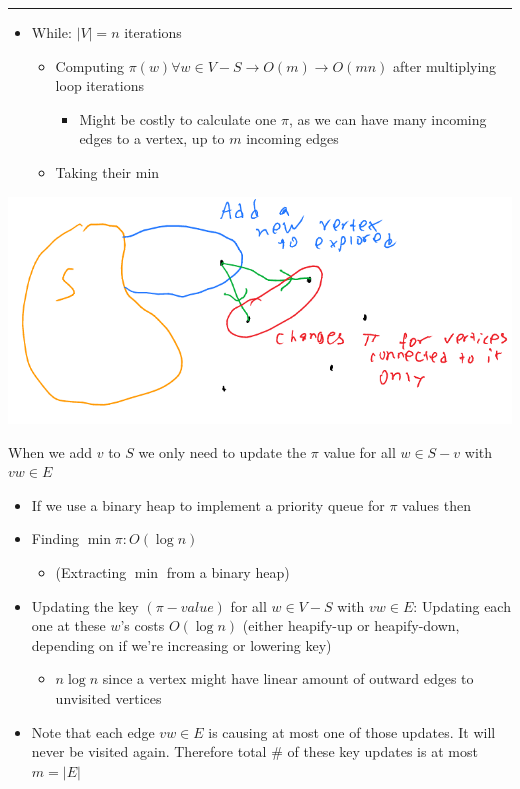 \documentclass[11pt]{article}
\begin{document}
\noindent\rule{\textwidth}{0.5pt}
\begin{itemize}
\item While: \(|V| = n\) iterations
\begin{itemize}
\item Computing \(\pi(w) \forall w \in V - S \rightarrow O(m) \rightarrow O(mn)\) after multiplying loop iterations
\begin{itemize}
\item Might be costly to calculate one \(\pi\), as we can have many incoming edges to a vertex, up to \(m\) incoming edges
\end{itemize}
\item Taking their min
\end{itemize}
\end{itemize}
\begin{center}
\includegraphics[width=.9\linewidth]{./Images/i41.png}
\end{center}
When we add \(v\) to \(S\) we only need to update the \(\pi\) value for all \(w \in S-v\) with \(vw \in E\)
\begin{itemize}
\item If we use a binary heap to implement a priority queue for \(\pi\) values then
\item Finding \(\min \pi : O(\log n)\)
\begin{itemize}
\item (Extracting \(\min\) from a binary heap)
\end{itemize}
\item Updating the key \((\pi-value)\) for all \(w\in V-S\) with \(vw \in E\): Updating each one at these \(w\)'s costs \(O(\log n)\) (either heapify-up or heapify-down, depending on if we're increasing or lowering key)
\begin{itemize}
\item \(n \log n\) since a vertex might have linear amount of outward edges to unvisited vertices
\end{itemize}
\item Note that each edge \(vw \in E\) is causing at most one of those updates. It will never be visited again. Therefore total \# of these key updates is at most \(m=|E|\)
\end{itemize}
\end{document}
